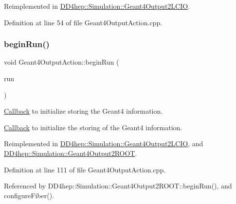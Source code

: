 Reimplemented in \hyperlink{class_d_d4hep_1_1_simulation_1_1_geant4_output2_l_c_i_o_a36b7ecdf04169c4597bae18e021b60ea}{D\+D4hep\+::\+Simulation\+::\+Geant4\+Output2\+L\+C\+IO}.



Definition at line 54 of file Geant4\+Output\+Action.\+cpp.

\hypertarget{class_d_d4hep_1_1_simulation_1_1_geant4_output_action_afc8b13d72433d8f917555e952e1ce528}{}\label{class_d_d4hep_1_1_simulation_1_1_geant4_output_action_afc8b13d72433d8f917555e952e1ce528} 
\subsubsection{\texorpdfstring{begin\+Run()}{beginRun()}}
{\footnotesize\ttfamily void Geant4\+Output\+Action\+::begin\+Run (\begin{DoxyParamCaption}\item[{const G4\+Run $\ast$}]{run }\end{DoxyParamCaption})\hspace{0.3cm}{\ttfamily [virtual]}}



\hyperlink{class_d_d4hep_1_1_callback}{Callback} to initialize storing the Geant4 information. 

\hyperlink{class_d_d4hep_1_1_callback}{Callback} to initialize the storing of the Geant4 information. 

Reimplemented in \hyperlink{class_d_d4hep_1_1_simulation_1_1_geant4_output2_l_c_i_o_aebca66a953f5c24b0098b5066fe4c3fc}{D\+D4hep\+::\+Simulation\+::\+Geant4\+Output2\+L\+C\+IO}, and \hyperlink{class_d_d4hep_1_1_simulation_1_1_geant4_output2_r_o_o_t_a03f3906460b18ff0b31b9c0f9060d93d}{D\+D4hep\+::\+Simulation\+::\+Geant4\+Output2\+R\+O\+OT}.



Definition at line 111 of file Geant4\+Output\+Action.\+cpp.



Referenced by D\+D4hep\+::\+Simulation\+::\+Geant4\+Output2\+R\+O\+O\+T\+::begin\+Run(), and configure\+Fiber().

\hypertarget{class_d_d4hep_1_1_simulation_1_1_geant4_output_action_a1d83299b79de6a1a75e70ef5a9e4d3eb}{}\label{class_d_d4hep_1_1_simulation_1_1_geant4_output_action_a1d83299b79de6a1a75e70ef5a9e4d3eb} 
